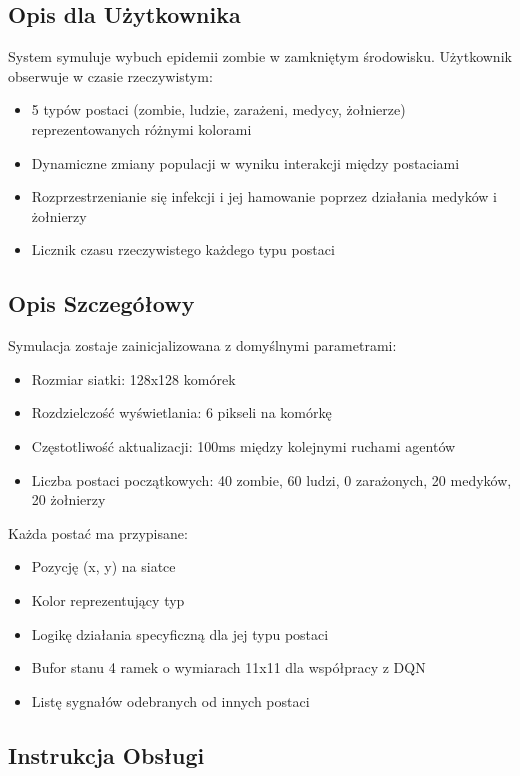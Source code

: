 \documentclass[12pt,a4paper]{article}
\begin{document}
\subsection{Opis dla Użytkownika}
System symuluje wybuch epidemii zombie w zamkniętym środowisku. Użytkownik
obserwuje w czasie rzeczywistym:
\begin{itemize}
	\item 5 typów postaci (zombie, ludzie, zarażeni, medycy, żołnierze) reprezentowanych różnymi kolorami
	\item Dynamiczne zmiany populacji w wyniku interakcji między postaciami
	\item Rozprzestrzenianie się infekcji i jej hamowanie poprzez działania medyków i
	      żołnierzy
	\item Licznik czasu rzeczywistego każdego typu postaci
\end{itemize}

\subsection{Opis Szczegółowy}
Symulacja zostaje zainicjalizowana z domyślnymi parametrami:
\begin{itemize}
	\item Rozmiar siatki: 128x128 komórek
	\item Rozdzielczość wyświetlania: 6 pikseli na komórkę
	\item Częstotliwość aktualizacji: 100ms między kolejnymi ruchami agentów
	\item Liczba postaci początkowych: 40 zombie, 60 ludzi, 0 zarażonych, 20 medyków, 20
	      żołnierzy
\end{itemize}

Każda postać ma przypisane:
\begin{itemize}
	\item Pozycję (x, y) na siatce
	\item Kolor reprezentujący typ
	\item Logikę działania specyficzną dla jej typu postaci
	\item Bufor stanu 4 ramek o wymiarach 11x11 dla współpracy z DQN
	\item Listę sygnałów odebranych od innych postaci
\end{itemize}

\subsection{Instrukcja Obsługi}
\end{document}
